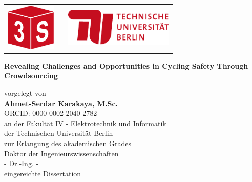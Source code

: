 \begin{titlepage}
	\centering
	\begin{table}[!ht]\centering
	  \begin{tabularx}{\textwidth}{@{} l X r @{}}
	     \includegraphics[height=2.25cm]{fig/3s-red-logo.pdf} &  & \includegraphics[height=1.8cm]{fig/tu-berlin-logo-long-red.pdf}\\
	  \end{tabularx}
	\end{table}
	
	
	\vspace{1.0cm}
	\Large\textbf{Revealing Challenges and Opportunities in Cycling Safety Through Crowdsourcing}\\ 
	\vspace{1.0cm}
	
	\normalsize vorgelegt von  \\
	\vspace{0.20cm}
	\large \textbf{Ahmet-Serdar Karakaya, M.Sc.}\\
	\normalsize ORCID: 0000-0002-2040-2782\\
	
	\vspace{0.8cm}
	\normalsize an der Fakultät IV - Elektrotechnik und Informatik\\
	\normalsize der Technischen Universität Berlin\\
	\normalsize zur Erlangung des akademischen Grades\\
	\vspace{0.20cm}
	\normalsize Doktor der Ingenieurswissenschaften\\
	\normalsize - Dr.-Ing. -\\
	\vspace{0.8cm}
	\normalsize eingereichte Dissertation\\
	
	\vspace{0.1cm}
	

\end{titlepage}

